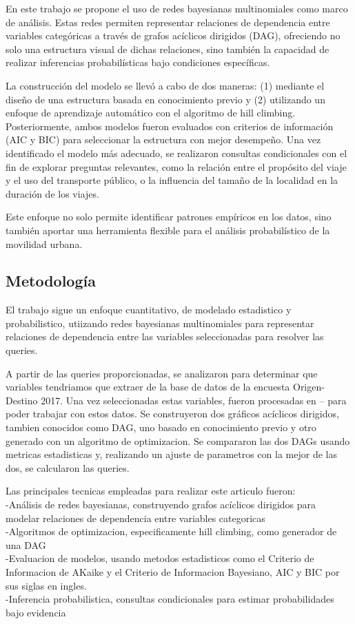 \documentclass[
  11pt,
  a4paper,
]{article}
\begin{document}
En este trabajo se propone el uso de redes bayesianas multinomiales como
marco de análisis. Estas redes permiten representar relaciones de
dependencia entre variables categóricas a través de grafos acíclicos
dirigidos (DAG), ofreciendo no solo una estructura visual de dichas
relaciones, sino también la capacidad de realizar inferencias
probabilísticas bajo condiciones específicas.

La construcción del modelo se llevó a cabo de dos maneras: (1) mediante
el diseño de una estructura basada en conocimiento previo y (2)
utilizando un enfoque de aprendizaje automático con el algoritmo de hill
climbing. Posteriormente, ambos modelos fueron evaluados con criterios
de información (AIC y BIC) para seleccionar la estructura con mejor
desempeño. Una vez identificado el modelo más adecuado, se realizaron
consultas condicionales con el fin de explorar preguntas relevantes,
como la relación entre el propósito del viaje y el uso del transporte
público, o la influencia del tamaño de la localidad en la duración de
los viajes.

Este enfoque no solo permite identificar patrones empíricos en los
datos, sino también aportar una herramienta flexible para el análisis
probabilístico de la movilidad urbana.

\subsection{Metodología}\label{metodologuxeda}

El trabajo sigue un enfoque cuantitativo, de modelado estadistico y
probabilistico, utiizando redes bayesianas multinomiales para
representar relaciones de dependencia entre las variables seleccionadas
para resolver las queries.

A partir de las queries proporcionadas, se analizaron para determinar
que variables tendriamos que extraer de la base de datos de la encuesta
Origen-Destino 2017. Una vez seleccionadas estas variables, fueron
procesadas en -- para poder trabajar con estos datos. Se construyeron
dos gráficos acíclicos dirigidos, tambien conocidos como DAG, uno basado
en conocimiento previo y otro generado con un algoritmo de optimizacion.
Se compararon las dos DAGs usando metricas estadisticas y, realizando un
ajuste de parametros con la mejor de las dos, se calcularon las queries.

Las principales tecnicas empleadas para realizar este articulo fueron:\\
-Análisis de redes bayesianas, construyendo grafos acíclicos dirigidos
para modelar relaciones de dependencia entre variables categoricas\\
-Algoritmos de optimizacion, especificamente hill climbing, como
generador de una DAG\\
-Evaluacion de modelos, usando metodos estadisticos como el Criterio de
Informacion de AKaike y el Criterio de Informacion Bayesiano, AIC y BIC
por sus siglas en ingles.\\
-Inferencia probabilistica, consultas condicionales para estimar
probabilidades bajo evidencia
\end{document}

